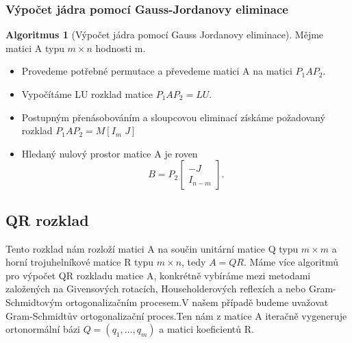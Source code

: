 \documentclass{article}
\theoremstyle{plain}
\theoremstyle{definition}
\newtheorem{algoritmus}{Algoritmus}
\begin{document}
\subsubsection{Výpočet jádra pomocí Gauss-Jordanovy eliminace}
\begin{algoritmus}[Výpočet jádra pomocí Gauss Jordanovy eliminace]
    Mějme matici A typu $m \times n$ hodnosti m.
    \begin{itemize}
        \item Provedeme potřebné permutace a převedeme matici A na matici $P_1AP_2.$
        \item Vypočítáme LU rozklad matice $P_1AP_2=LU.$
        \item Postupným přenásobováním a sloupcovou eliminací získáme požadovaný rozklad $ P_1 A P_2 = M [I_m \; J]$
        \item Hledaný nulový prostor matice A je roven \[B=P_2 \begin{bmatrix}
            -J\\
            I_{n-m}
        \end{bmatrix}.\]
    \end{itemize}
    
    
\end{algoritmus}

\subsection{QR rozklad}
Tento rozklad nám rozloží matici A na součin unitární matice Q typu $m \times m$ a horní trojuhelníkové matice R typu $m \times n$, tedy $A=QR.$
Máme více algoritmů pro výpočet QR rozkladu matice A, konkrétně vybíráme mezi metodami založených na Givensových rotacích, Householderových reflexích a nebo Gram-Schmidtovým ortogonalizačním procesem.V našem případě budeme uvažovat Gram-Schmidtův ortogonalizační proces.Ten nám z matice A iteračně vygeneruje ortonormální bázi $Q=(q_1,\hdots,q_m)$ a matici koeficientů R.
\end{document}
